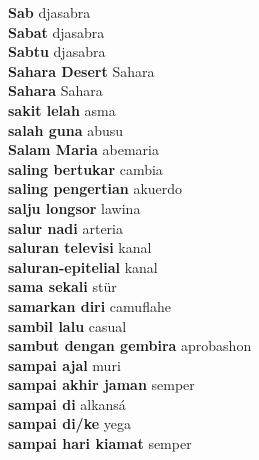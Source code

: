 \textbf{ Sab  } djasabra \\
\textbf{ Sabat  } djasabra \\
\textbf{ Sabtu  } djasabra \\
\textbf{ Sahara Desert  } Sahara \\
\textbf{ Sahara  } Sahara \\
\textbf{ sakit lelah  } asma \\
\textbf{ salah guna  } abusu \\
\textbf{ Salam Maria  } abemaria \\
\textbf{ saling bertukar  } cambia \\
\textbf{ saling pengertian  } akuerdo \\
\textbf{ salju longsor  } lawina \\
\textbf{ salur nadi  } arteria \\
\textbf{ saluran televisi  } kanal \\
\textbf{ saluran-epitelial  } kanal \\
\textbf{ sama sekali  } stür \\
\textbf{ samarkan diri  } camuflahe \\
\textbf{ sambil lalu  } casual \\
\textbf{ sambut dengan gembira  } aprobashon \\
\textbf{ sampai ajal  } muri \\
\textbf{ sampai akhir jaman  } semper \\
\textbf{ sampai di  } alkansá \\
\textbf{ sampai di/ke  } yega \\
\textbf{ sampai hari kiamat  } semper \\
